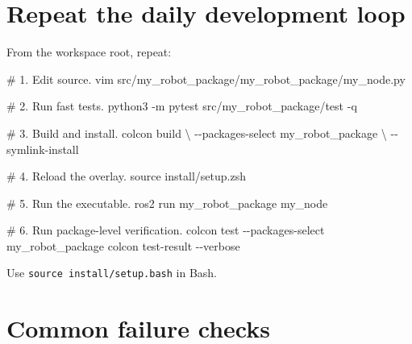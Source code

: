 \documentclass[
  australian,
  12pt,
  letterpaper,
  DIV=11,
  numbers=noendperiod,
  twoside]{scrreprt}
\newenvironment{Shaded}{\begin{snugshade}}{\end{snugshade}}
\newcommand{\AttributeTok}[1]{\textcolor[rgb]{0.40,0.45,0.13}{#1}}
\newcommand{\BuiltInTok}[1]{\textcolor[rgb]{0.00,0.23,0.31}{#1}}
\newcommand{\CommentTok}[1]{\textcolor[rgb]{0.37,0.37,0.37}{#1}}
\newcommand{\DataTypeTok}[1]{\textcolor[rgb]{0.68,0.00,0.00}{#1}}
\newcommand{\ExtensionTok}[1]{\textcolor[rgb]{0.00,0.23,0.31}{#1}}
\newcommand{\NormalTok}[1]{\textcolor[rgb]{0.00,0.23,0.31}{#1}}
\begin{document}
\section{Repeat the daily development
loop}\label{repeat-the-daily-development-loop}

From the workspace root, repeat:

\begin{Shaded}
\begin{Highlighting}[]
\CommentTok{\# 1. Edit source.}
\ExtensionTok{vim}\NormalTok{ src/my\_robot\_package/my\_robot\_package/my\_node.py}

\CommentTok{\# 2. Run fast tests.}
\ExtensionTok{python3} \AttributeTok{{-}m}\NormalTok{ pytest src/my\_robot\_package/test }\AttributeTok{{-}q}

\CommentTok{\# 3. Build and install.}
\ExtensionTok{colcon}\NormalTok{ build }\DataTypeTok{\textbackslash{}}
  \AttributeTok{{-}{-}packages{-}select}\NormalTok{ my\_robot\_package }\DataTypeTok{\textbackslash{}}
  \AttributeTok{{-}{-}symlink{-}install}

\CommentTok{\# 4. Reload the overlay.}
\BuiltInTok{source}\NormalTok{ install/setup.zsh}

\CommentTok{\# 5. Run the executable.}
\ExtensionTok{ros2}\NormalTok{ run my\_robot\_package my\_node}

\CommentTok{\# 6. Run package{-}level verification.}
\ExtensionTok{colcon}\NormalTok{ test }\AttributeTok{{-}{-}packages{-}select}\NormalTok{ my\_robot\_package}
\ExtensionTok{colcon}\NormalTok{ test{-}result }\AttributeTok{{-}{-}verbose}
\end{Highlighting}
\end{Shaded}

Use \texttt{source\ install/setup.bash} in Bash.

\section*{Common failure checks}\label{common-failure-checks}

\end{document}
